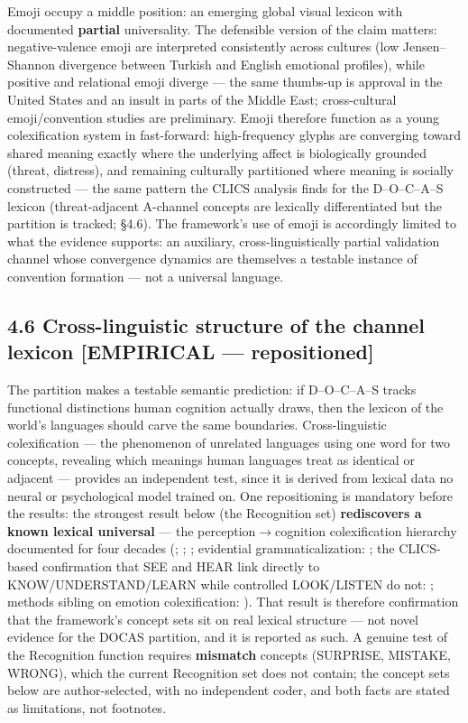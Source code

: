 \documentclass[
]{article}
\begin{document}
Emoji occupy a middle position: an emerging global visual lexicon with
documented \textbf{partial} universality. The defensible version of the
claim matters: negative-valence emoji are interpreted consistently
across cultures (low Jensen--Shannon divergence between Turkish and
English emotional profiles), while positive and relational emoji diverge
--- the same thumbs-up is approval in the United States and an insult in
parts of the Middle East; cross-cultural emoji/convention studies are
preliminary. Emoji therefore function as a young colexification system
in fast-forward: high-frequency glyphs are converging toward shared
meaning exactly where the underlying affect is biologically grounded
(threat, distress), and remaining culturally partitioned where meaning
is socially constructed --- the same pattern the CLICS analysis finds
for the D--O--C--A--S lexicon (threat-adjacent A-channel concepts are
lexically differentiated but the partition is tracked; §4.6). The
framework's use of emoji is accordingly limited to what the evidence
supports: an auxiliary, cross-linguistically partial validation channel
whose convergence dynamics are themselves a testable instance of
convention formation --- not a universal language.

\subsection{4.6 Cross-linguistic structure of the channel lexicon
{[}EMPIRICAL ---
repositioned{]}}\label{cross-linguistic-structure-of-the-channel-lexicon-empirical-repositioned}

The partition makes a testable semantic prediction: if D--O--C--A--S
tracks functional distinctions human cognition actually draws, then the
lexicon of the world's languages should carve the same boundaries.
Cross-linguistic colexification --- the phenomenon of unrelated
languages using one word for two concepts, revealing which meanings
human languages treat as identical or adjacent --- provides an
independent test, since it is derived from lexical data no neural or
psychological model trained on. One repositioning is mandatory before
the results: the strongest result below (the Recognition set)
\textbf{rediscovers a known lexical universal} --- the
perception\(\to\)cognition colexification hierarchy documented for four
decades (; ; ; evidential grammaticalization: ; the CLICS-based
confirmation that SEE and HEAR link directly to KNOW/UNDERSTAND/LEARN
while controlled LOOK/LISTEN do not: ; methods sibling on emotion
colexification: ). That result is therefore confirmation that the
framework's concept sets sit on real lexical structure --- not novel
evidence for the DOCAS partition, and it is reported as such. A genuine
test of the Recognition function requires \textbf{mismatch} concepts
(SURPRISE, MISTAKE, WRONG), which the current Recognition set does not
contain; the concept sets below are author-selected, with no independent
coder, and both facts are stated as limitations, not footnotes.
\end{document}
